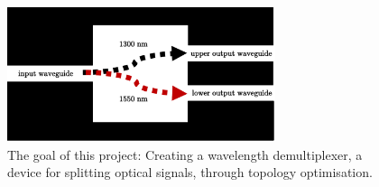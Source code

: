 \begin{figure}[h!]
    \centering
    \includegraphics[width=0.7\textwidth]
    {fig/introduction/demultiplexer.pdf}
    \caption{The goal of this project: Creating a wavelength demultiplexer, a device for splitting optical signals, through topology optimisation.}
    \label{fig:my_label}
\end{figure}
